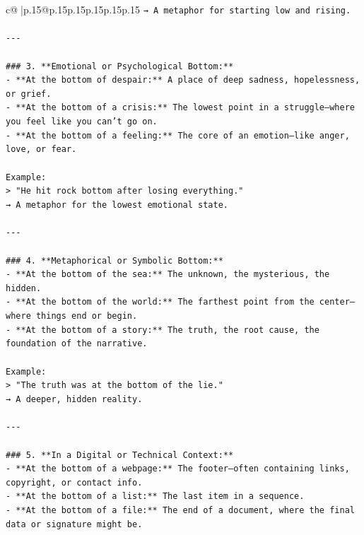\documentclass{article}
\begin{document}
{\begin{supertabular}{c@{$\;$}|p{.15\linewidth}@{}p{.15\linewidth}p{.15\linewidth}p{.15\linewidth}p{.15\linewidth}p{.15\linewidth}}
{{{\texttt{→ A metaphor for starting low and rising.} \\
\\ 
\texttt{{-}{-}{-}} \\
\\ 
\texttt{\#\#\# 3. **Emotional or Psychological Bottom:**} \\
\texttt{{-} **At the bottom of despair:** A place of deep sadness, hopelessness, or grief.} \\
\texttt{{-} **At the bottom of a crisis:** The lowest point in a struggle—where you feel like you can’t go on.} \\
\texttt{{-} **At the bottom of a feeling:** The core of an emotion—like anger, love, or fear.} \\
\\ 
\texttt{Example:  } \\
\texttt{> "He hit rock bottom after losing everything."  } \\
\texttt{→ A metaphor for the lowest emotional state.} \\
\\ 
\texttt{{-}{-}{-}} \\
\\ 
\texttt{\#\#\# 4. **Metaphorical or Symbolic Bottom:**} \\
\texttt{{-} **At the bottom of the sea:** The unknown, the mysterious, the hidden.} \\
\texttt{{-} **At the bottom of the world:** The farthest point from the center—where things end or begin.} \\
\texttt{{-} **At the bottom of a story:** The truth, the root cause, the foundation of the narrative.} \\
\\ 
\texttt{Example:  } \\
\texttt{> "The truth was at the bottom of the lie."  } \\
\texttt{→ A deeper, hidden reality.} \\
\\ 
\texttt{{-}{-}{-}} \\
\\ 
\texttt{\#\#\# 5. **In a Digital or Technical Context:**} \\
\texttt{{-} **At the bottom of a webpage:** The footer—often containing links, copyright, or contact info.} \\
\texttt{{-} **At the bottom of a list:** The last item in a sequence.} \\
\texttt{{-} **At the bottom of a file:** The end of a document, where the final data or signature might be.} \\
}}}
\end{supertabular}}
\end{document}
